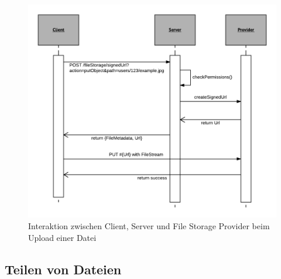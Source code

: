 \begin{figure}[H]
	\centering
	\includegraphics[width=1\linewidth]{images/fileuploadumlsequence}
	\caption[Caption for concept]{Interaktion zwischen Client, Server und File Storage Provider beim Upload einer Datei}
	\label{fig:interaction_upload}
\end{figure}


\subsection{Teilen von Dateien}
\label{sec:sharing_concept}


